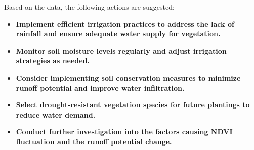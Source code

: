\documentclass[12pt,a4paper]{article}
\begin{document}
\begin{tcolorbox}[colback=white, colframe=hydrosenscyan]
Based on the data, the following actions are suggested:
\begin{itemize}
    \item \textbf{Implement efficient irrigation practices to address the lack of rainfall and ensure adequate water supply for vegetation.}
    \item \textbf{Monitor soil moisture levels regularly and adjust irrigation strategies as needed.}
    \item \textbf{Consider implementing soil conservation measures to minimize runoff potential and improve water infiltration.}
    \item \textbf{Select drought-resistant vegetation species for future plantings to reduce water demand.}
    \item \textbf{Conduct further investigation into the factors causing NDVI fluctuation and the runoff potential change.}
\end{itemize}
\end{tcolorbox}
\end{document}

